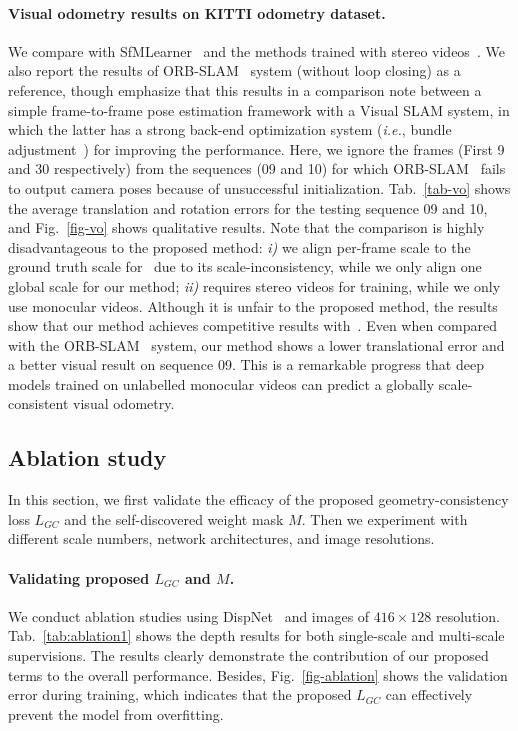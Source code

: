 \documentclass{article}
\newcommand{\figref}[1]{Fig.~\ref{#1}}
\newcommand{\tabref}[1]{Tab.~\ref{#1}}
\def\ie{\emph{i.e.}}
\begin{document}
\paragraph{Visual odometry results on KITTI odometry dataset.}
We compare with SfMLearner~\cite{zhou2017unsupervised} and the methods trained with stereo videos~\cite{zhan2018unsupervised}.
We also report the results of ORB-SLAM~\cite{mur2015orb} system (without loop closing) as a reference, though emphasize that this results in a comparison note between a simple frame-to-frame pose estimation framework with a Visual SLAM system, in which the latter has a strong back-end optimization system (\ie, bundle adjustment~\cite{triggs1999bundle}) for improving the performance.
Here, we ignore the frames (First 9 and 30 respectively) from the sequences (09 and 10) for which ORB-SLAM~\cite{mur2015orb} fails to output camera poses because of unsuccessful initialization.
\tabref{tab-vo} shows the average translation and rotation errors for the testing sequence 09 and 10, and \figref{fig-vo} shows qualitative results.
Note that the comparison is highly disadvantageous to the proposed method: 
\emph{i)} we align per-frame scale to the ground truth scale for~\cite{zhou2017unsupervised} due to its scale-inconsistency, while we only align one global scale for our method;
\emph{ii)} \cite{zhan2018unsupervised} requires stereo videos for training, while we only use monocular videos.
Although it is unfair to the proposed method, the results show that our method achieves competitive results with~\cite{zhan2018unsupervised}.
Even when compared with the ORB-SLAM~\cite{mur2015orb} system, our method shows a lower translational error and a better visual result on sequence 09. 
This is a remarkable progress that deep models trained on unlabelled monocular videos can predict a globally scale-consistent visual odometry.



\subsection{Ablation study}\label{sec-ablation}

In this section, we first validate the efficacy of the proposed geometry-consistency loss $L_{GC}$ and the self-discovered weight mask $M$.
Then we experiment with different scale numbers, network architectures, and image resolutions.

\paragraph{Validating proposed $L_{GC}$ and $M$.}
We conduct ablation studies using DispNet~\cite{zhou2017unsupervised} and images of $416 \times 128$ resolution.
\tabref{tab:ablation1} shows the depth results for both single-scale and multi-scale supervisions.
The results clearly demonstrate the contribution of our proposed terms to the overall performance.
Besides, \figref{fig-ablation} shows the validation error during training, which indicates that the proposed $L_{GC}$ can effectively prevent the model from overfitting.
\end{document}
